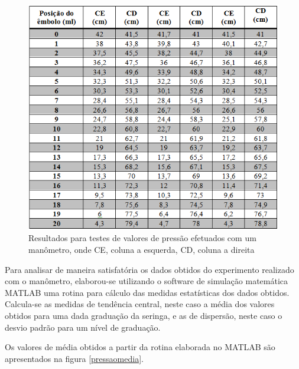 \begin{figure}[H]
		\centering
			\includegraphics[scale=1.0]{figuras/resultadosmanometro.png}
		\caption{Resultados para testes de valores de pressão efetuados com um manômetro, onde CE, coluna a esquerda, CD, coluna a direita}
		\label{resultadosmanometro}
\end{figure}

Para analisar de maneira satisfatória os dados obtidos do experimento realizado com o manômetro, elaborou-se utilizando o software de simulação matemática MATLAB uma rotina para cálculo das medidas estatísticas dos dados obtidos. Calcula-se as medidas de tendência central, neste caso a média dos valores obtidos para uma dada graduação da seringa, e as de dispersão, neste caso o desvio padrão para um nível de graduação. 

Os valores de média obtidos a partir da rotina elaborada no MATLAB são apresentados na figura \ref{pressaomedia}. 

